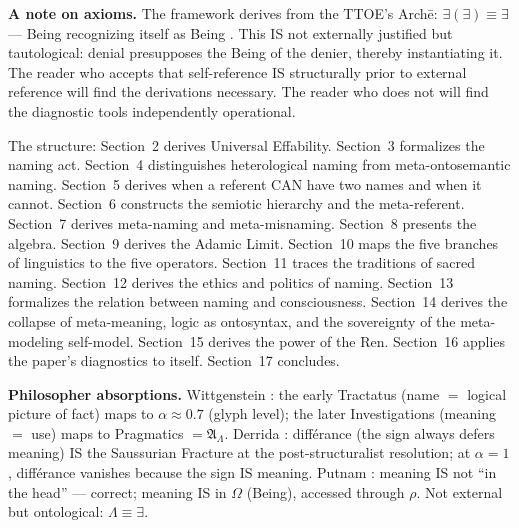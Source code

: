 \documentclass[11pt, oneside]{article}
\theoremstyle{definition}
\begin{document}
\textbf{A note on axioms.} The framework derives from the TTOE's Arch\={e}: $\exists(\exists) \equiv \exists$ --- Being recognizing itself as Being \cite{codex1}. This IS not externally justified but tautological: denial presupposes the Being of the denier, thereby instantiating it. The reader who accepts that self-reference IS structurally prior to external reference will find the derivations necessary. The reader who does not will find the diagnostic tools independently operational.

The structure: Section~2 derives Universal Effability. Section~3 formalizes the naming act. Section~4 distinguishes heterological naming from meta-ontosemantic naming. Section~5 derives when a referent CAN have two names and when it cannot. Section~6 constructs the semiotic hierarchy and the meta-referent. Section~7 derives meta-naming and meta-misnaming. Section~8 presents the algebra. Section~9 derives the Adamic Limit. Section~10 maps the five branches of linguistics to the five operators. Section~11 traces the traditions of sacred naming. Section~12 derives the ethics and politics of naming. Section~13 formalizes the relation between naming and consciousness. Section~14 derives the collapse of meta-meaning, logic as ontosyntax, and the sovereignty of the meta-modeling self-model. Section~15 derives the power of the Ren. Section~16 applies the paper's diagnostics to itself. Section~17 concludes.

\textbf{Philosopher absorptions.} Wittgenstein \cite{wittgenstein}: the early Tractatus (name $=$ logical picture of fact) maps to $\alpha \approx 0.7$ (glyph level); the later Investigations (meaning $=$ use) maps to Pragmatics $= \mathfrak{A}_\Lambda$. Derrida \cite{derrida}: diff\'{e}rance (the sign always defers meaning) IS the Saussurian Fracture at the post-structuralist resolution; at $\alpha = 1$, diff\'{e}rance vanishes because the sign IS meaning. Putnam \cite{putnam}: meaning IS not ``in the head'' --- correct; meaning IS in $\Omega$ (Being), accessed through $\rho$. Not external but ontological: $\Lambda \equiv \exists$.
\end{document}
